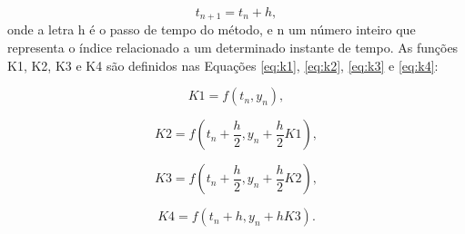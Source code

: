 \begin{equation}\label{eq:t}
t_{n+1}=t_n+h,
\end{equation}
onde a letra h é o passo de tempo do método, e n um número inteiro que representa o índice relacionado a um determinado instante de tempo. As funções K1, K2, K3 e K4 são definidos nas Equações \ref{eq:k1}, \ref{eq:k2}, \ref{eq:k3} e \ref{eq:k4}:


\begin{equation}\label{eq:k1}
K1=f(t_n,y_n),
\end{equation}

\begin{equation}\label{eq:k2}
K2=f(t_n+ \frac{h}{2},y_n+\frac{h}{2}K1),
\end{equation}

\begin{equation}\label{eq:k3}
K3=f(t_n+ \frac{h}{2},y_n+\frac{h}{2}K2),
\end{equation}

\begin{equation}\label{eq:k4}
K4 = f(t_n + h, y_n + hK3 ).
\end{equation}


